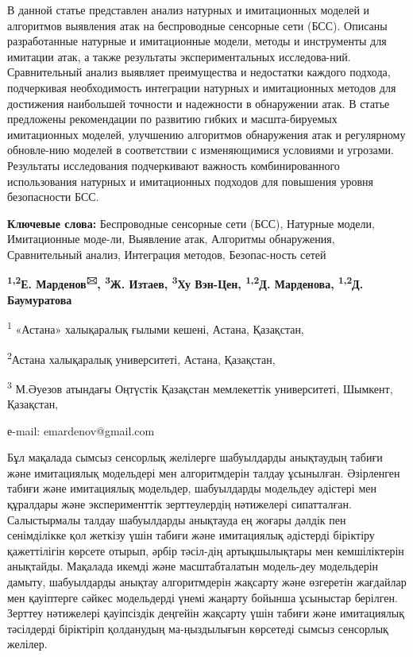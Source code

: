 В данной статье представлен анализ натурных и имитационных моделей и
алгоритмов выявления атак на беспроводные сенсорные сети (БСС). Описаны
разработанные натурные и имитационные модели, методы и инструменты для
имитации атак, а также результаты экспериментальных исследова-ний.
Сравнительный анализ выявляет преимущества и недостатки каждого подхода,
подчеркивая необходимость интеграции натурных и имитационных методов для
достижения наибольшей точности и надежности в обнаружении атак. В статье
предложены рекомендации по развитию гибких и масшта-бируемых имитационных
моделей, улучшению алгоритмов обнаружения атак и регулярному обновле-нию
моделей в соответствии с изменяющимися условиями и угрозами. Результаты
исследования подчеркивают важность комбинированного использования
натурных и имитационных подходов для повышения уровня безопасности БСС.

{\bfseries Ключевые слова:} Беспроводные сенсорные сети (БСС), Натурные
модели, Имитационные моде-ли, Выявление атак, Алгоритмы обнаружения,
Сравнительный анализ, Интеграция методов, Безопас-ность сетей


\begin{center}
{\bfseries \textsuperscript{1,2}Е. Марденов\textsuperscript{🖂},
\textsuperscript{3}Ж. Изтаев, \textsuperscript{3}Ху Вэн-Цен,
\textsuperscript{1,2}Д. Марденова, \textsuperscript{1,2}Д. Баумуратова}

\textsuperscript{1} «Астана» халықаралық ғылыми кешені, Астана,
Қазақстан,

\textsuperscript{2}Астана халықаралық университеті, Астана, Қазақстан,

\textsuperscript{3} М.Әуезов атындағы Оңтүстік Қазақстан мемлекеттік
университеті, Шымкент, Қазақстан,

е-mail: emardenov@gmail.com
\end{center}

Бұл мақалада сымсыз сенсорлық желілерге шабуылдарды анықтаудың табиғи
және имитациялық модельдері мен алгоритмдерін талдау ұсынылған.
Әзірленген табиғи және имитациялық модельдер, шабуылдарды модельдеу
әдістері мен құралдары және эксперименттік зерттеулердің нәтижелері
сипатталған. Салыстырмалы талдау шабуылдарды анықтауда ең жоғары дәлдік
пен сенімділікке қол жеткізу үшін табиғи және имитациялық әдістерді
біріктіру қажеттілігін көрсете отырып, әрбір тәсіл-дің артықшылықтары мен
кемшіліктерін анықтайды. Мақалада икемді және масштабталатын модель-деу
модельдерін дамыту, шабуылдарды анықтау алгоритмдерін жақсарту және
өзгеретін жағдайлар мен қауіптерге сәйкес модельдерді үнемі жаңарту
бойынша ұсыныстар берілген. Зерттеу нәтижелері қауіпсіздік деңгейін
жақсарту үшін табиғи және имитациялық тәсілдерді біріктіріп қолданудың
ма-ңыздылығын көрсетеді сымсыз сенсорлық желілер.

